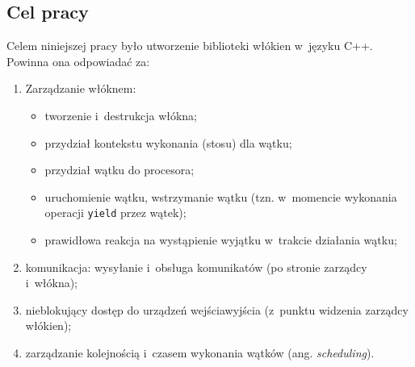 \documentclass[12pt,makeidx]{mwart}
\begin{document}
\subsection{Cel pracy}
\indent
  Celem niniejszej pracy było utworzenie biblioteki włókien w~języku C++.
	Powinna ona odpowiadać za:
	\begin{enumerate}
		\item Zarządzanie włóknem:
		\begin{itemize}
			\item tworzenie i~destrukcja włókna;
			\item przydział kontekstu wykonania (stosu) dla wątku;
			\item przydział wątku do procesora;
			\item uruchomienie wątku, wstrzymanie wątku (tzn. w~momencie wykonania operacji {\tt yield} przez wątek);
			\item prawidłowa reakcja na wystąpienie wyjątku w~trakcie działania wątku;
		\end{itemize}
		\item komunikacja: wysyłanie i~obsługa komunikatów (po stronie zarządcy i~włókna);
		\item nieblokujący dostęp do  urządzeń wejścia\dywiz wyjścia (z~punktu widzenia zarządcy włókien);
		\item zarządzanie kolejnością i~czasem wykonania wątków (ang. \emph{scheduling}).
	\end{enumerate}
\par
%
\end{document}
